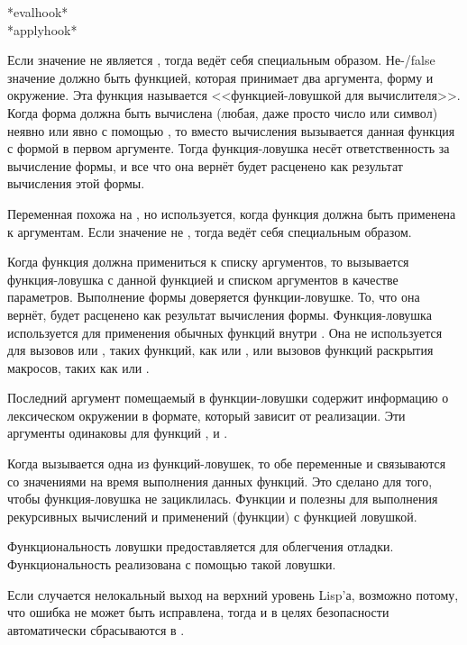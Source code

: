 \begin{defun}[Переменная]
*evalhook* \\
*applyhook*

Если значение  не является {\false}, тогда  ведёт себя
специальным образом. Не-{/false} значение  должно быть функцией,
которая принимает два аргумента, форму и окружение.
Эта функция называется <<функцией-ловушкой для вычислителя>>.
Когда форма должна быть вычислена (любая, даже просто число или символ) неявно или явно с
помощью , то вместо вычисления вызывается данная функция с формой в
первом аргументе.
Тогда функция-ловушка несёт ответственность за вычисление формы, и все что она
вернёт будет расценено как результат вычисления этой формы.

Переменная  похожа на , но используется, когда
функция должна быть применена к аргументам.
Если значение  не {\false}, тогда  ведёт себя
специальным образом.

Когда функция должна примениться к списку аргументов, то вызывается
функция-ловушка с данной функцией и списком аргументов в качестве параметров.
Выполнение формы доверяется функции-ловушке. То, что она вернёт, будет расценено
как результат вычисления формы.
Функция-ловушка используется для применения обычных функций внутри
. Она не используется для вызовов  или
, таких функций, как  или , или
вызовов функций раскрытия макросов, таких как  или .

Последний аргумент помещаемый в функции-ловушки содержит информацию о
лексическом окружении в формате, который зависит от реализации.
Эти аргументы одинаковы для функций ,  и
.

Когда вызывается одна из функций-ловушек, то обе переменные  и
 связываются со значениями {\nil} на время выполнения данных
функций. Это сделано для того, чтобы функция-ловушка не зациклилась.
Функции  и  полезны для выполнения рекурсивных
вычислений и применений (функции) с функцией ловушкой.

Функциональность ловушки предоставляется для облегчения отладки.
Функциональность  реализована с помощью такой ловушки.

Если случается нелокальный выход на верхний уровень Lisp'а, возможно потому, что
ошибка не может быть исправлена, тогда  и 
в целях безопасности автоматически сбрасываются в {\false}.
\end{defun}

